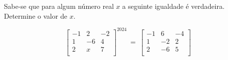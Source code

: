 \begin{problem} 
Sabe-se que para algum número real $x$ a seguinte igualdade é verdadeira. Determine o valor de $x$.

$$\left[ \begin{array}{rrr}
 -1 &   2 & -2 \\
  1 &  -6 &  4 \\
  2 &   x &  7 \\
\end{array}\right]^{2024} \ =\ 
\left[ \begin{array}{rrr}
 -1 &   6 & -4 \\
  1 &  -2 &  2 \\
  2 &  -6 &  5 \\
\end{array}\right]$$
\end{problem}
